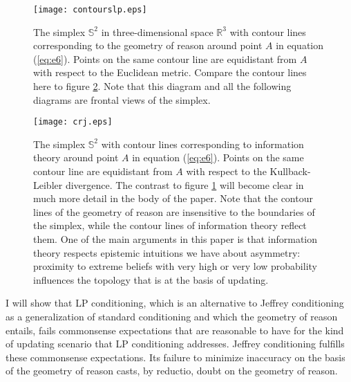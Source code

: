 \documentclass[11pt]{article}
\begin{document}
\begin{figure}[ht]
  \begin{flushright}
    \begin{minipage}[h]{.7\linewidth}
      \texttt{[image: contourslp.eps]}
      \caption{\footnotesize The simplex $\mathbb{S}^{2}$ in
        three-dimensional space $\mathbb{R}^{3}$ with contour lines
        corresponding to the geometry of reason around point $A$ in
        equation (\ref{eq:e6}). Points on the same contour line are
        equidistant from $A$ with respect to the Euclidean metric.
        Compare the contour lines here to figure \ref{fig:contoursrj}.
        Note that this diagram and all the following diagrams are
        frontal views of the simplex.}
      \label{fig:contourslp}
    \end{minipage}
  \end{flushright}
\end{figure}

\begin{figure}[ht]
  \begin{flushright}
    \begin{minipage}[h]{.7\linewidth}
      \texttt{[image: crj.eps]}
      \caption{\footnotesize The simplex $\mathbb{S}^{2}$ with contour
        lines corresponding to information theory around point $A$ in
        equation (\ref{eq:e6}). Points on the same contour line are
        equidistant from $A$ with respect to the Kullback-Leibler
        divergence. The contrast to figure \ref{fig:contourslp} will
        become clear in much more detail in the body of the paper.
        Note that the contour lines of the geometry of reason are
        insensitive to the boundaries of the simplex, while the
        contour lines of information theory reflect them. One of the
        main arguments in this paper is that information theory
        respects epistemic intuitions we have about asymmetry:
        proximity to extreme beliefs with very high or very low
        probability influences the topology that is at the basis of
        updating.}
      \label{fig:contoursrj}
    \end{minipage}
  \end{flushright}
\end{figure}

I will show that LP conditioning, which is an alternative to Jeffrey
conditioning as a generalization of standard conditioning and which
the geometry of reason entails, fails commonsense expectations that
are reasonable to have for the kind of updating scenario that LP
conditioning addresses. Jeffrey conditioning fulfills these
commonsense expectations. Its failure to minimize inaccuracy on the
basis of the geometry of reason casts, by reductio, doubt on the
geometry of reason.
\end{document}
